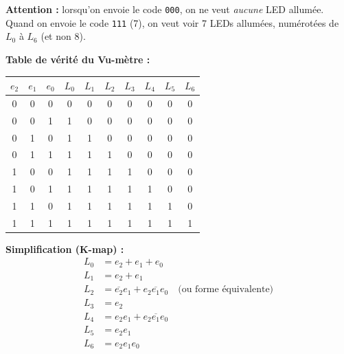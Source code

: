 \documentclass[a4paper,11pt]{article}
\newif\ifsolutions
\begin{document}
\ifsolutions
\begin{solbox}
\textbf{Attention :} lorsqu'on envoie le code \texttt{000}, on ne veut \textit{aucune} LED allumée. Quand on envoie le code \texttt{111} (7), on veut voir 7 LEDs allumées, numérotées de $L_0$ à $L_6$ (et non 8).

\textbf{Table de vérité du Vu-mètre :}
\begin{center}
  \renewcommand{\arraystretch}{1.2}
  \begin{tabular}{c c c c c c c c c c}
    \toprule
    $e_2$ & $e_1$ & $e_0$ & $L_0$ & $L_1$ & $L_2$ & $L_3$ & $L_4$ & $L_5$ & $L_6$ \\
    \midrule
    0 & 0 & 0 & 0 & 0 & 0 & 0 & 0 & 0 & 0 \\
    0 & 0 & 1 & 1 & 0 & 0 & 0 & 0 & 0 & 0 \\
    0 & 1 & 0 & 1 & 1 & 0 & 0 & 0 & 0 & 0 \\
    0 & 1 & 1 & 1 & 1 & 1 & 0 & 0 & 0 & 0 \\
    1 & 0 & 0 & 1 & 1 & 1 & 1 & 0 & 0 & 0 \\
    1 & 0 & 1 & 1 & 1 & 1 & 1 & 1 & 0 & 0 \\
    1 & 1 & 0 & 1 & 1 & 1 & 1 & 1 & 1 & 0 \\
    1 & 1 & 1 & 1 & 1 & 1 & 1 & 1 & 1 & 1 \\
    \bottomrule
  \end{tabular}
\end{center}

\textbf{Simplification (K-map) :}
\begin{align*}
    L_0 &= e_2 + e_1 + e_0 \\
    L_1 &= e_2 + e_1 \\
    L_2 &= \overline{e_2}e_1 + e_2\overline{e_1}e_0 \quad \text{(ou forme équivalente)} \\
    L_3 &= e_2 \\
    L_4 &= e_2 e_1 + e_2 \overline{e_1} e_0 \\
    L_5 &= e_2 e_1 \\
    L_6 &= e_2 e_1 e_0
\end{align*}


\end{solbox}
\end{document}
